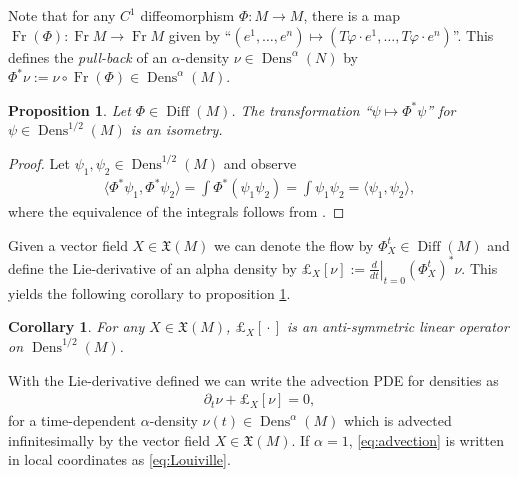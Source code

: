 \documentclass[letterpaper, 10 pt, conference]{ieeeconf}
\newtheorem{prop}[thm]{Proposition}
\newtheorem{cor}[thm]{Corollary}
\DeclareMathOperator{\Diff}{Diff}
\DeclareMathOperator{\Fr}{Fr}
\DeclareMathOperator{\Dens}{Dens}
\begin{document}
  Note that for any $C^1$ diffeomorphism $\Phi:M \to M$,
  there is a map $\Fr(\Phi) : \Fr M \to \Fr M$
  given by 
  ``$(e^1,\dots,e^n) \mapsto (T\varphi \cdot e^1, \dots, T\varphi \cdot e^n)$''.
  This defines the \emph{pull-back} of an $\alpha$-density
  $\nu \in \Dens^\alpha(N)$
  by $\Phi^* \nu := \nu \circ \Fr(\Phi) \in \Dens^\alpha(M)$.
  \begin{prop} \label{prop:isom}
    Let $\Phi \in \Diff(M)$.
    The transformation ``$\psi \mapsto \Phi^* \psi$'' for
    $\psi \in \Dens^{1/2}(M)$ is an isometry.
  \end{prop}
  \begin{proof}
    Let $\psi_1,\psi_2 \in \Dens^{1/2}(M)$ and observe
    \begin{align*}
      \langle \Phi^* \psi_1, \Phi^* \psi_2 \rangle
      = \int \Phi^*( \psi_1 \psi_2)
      = \int \psi_1 \psi_2
      = \langle \psi_1, \psi_2 \rangle,
    \end{align*}
    where the equivalence of the integrals follows
    from \cite[Proposition 14.32(c)]{Lee2006}.
  \end{proof}
  
  Given a vector field $X \in \mathfrak{X}(M)$
  we can denote the flow by $\Phi^t_X \in \Diff(M)$
  and define the Lie-derivative of an alpha density by
  $
    \pounds_X[ \nu ] := \left. \frac{d}{dt} \right|_{t=0} (\Phi_X^t)^* \nu.
  $
  This yields the following corollary to proposition \ref{prop:isom}.
  \begin{cor}
    For any $X \in \mathfrak{X}(M)$, $\pounds_X[ {}\cdot{} ]$
    is an anti-symmetric linear operator on $\Dens^{1/2}(M)$.
  \end{cor}
  With the Lie-derivative defined we can write the advection
  PDE for densities as
  \begin{align}
    \partial_t \nu + \pounds_X[\nu] = 0 \label{eq:advection},
  \end{align}
  for a time-dependent $\alpha$-density $\nu(t) \in \Dens^\alpha(M)$
  which is advected infinitesimally by the vector field 
  $X \in \mathfrak{X}(M)$.
  If $\alpha = 1$, \eqref{eq:advection} is written in local coordinates
  as \eqref{eq:Louiville}.
\end{document}
